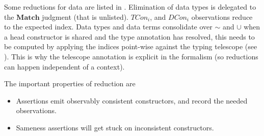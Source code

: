Some reductions for data are listed in .
Elimination of data types is delegated to the $\mathbf{Match}$ judgment (that is unlisted). 
$TCon_{i}$, and $DCon_{i}$ observations reduce to the expected index.
Data types and data terms consolidate over $\sim$ and $\cup$ when a head constructor is shared and the type annotation has resolved, this needs to be computed by applying the indices point-wise against the typing telescope (see ).
This is why the telescope annotation is explicit in the formalism (so reductions can happen independent of a context). 

The important properties of reduction are 
\begin{itemize}
\item Assertions emit observably consistent constructors, and record the needed observations.
\item Sameness assertions will get stuck on inconsistent constructors.
\end{itemize}

